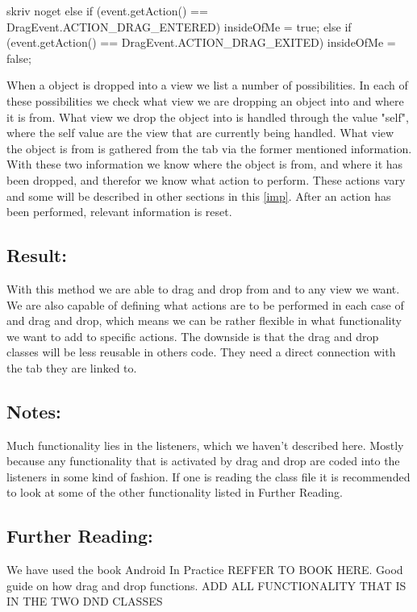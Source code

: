 \begin{source}[{elseif}]{skriv noget}
else if (event.getAction() == DragEvent.ACTION_DRAG_ENTERED){ 
			insideOfMe = true;
			} 
else if (event.getAction() == DragEvent.ACTION_DRAG_EXITED){
			insideOfMe = false;
			}
\end{source}
When a object is dropped into a view we list a number of possibilities. 
In each of these possibilities we check what view we are dropping an object into and where it is from. What view we drop the object into is handled through the value "self", where the self value are the view that are currently being handled. 
What view the object is from is gathered from the tab via the former mentioned information. 
With these two information we know where the object is from, and where it has been dropped, and therefor we know what action to perform. 
These actions vary and some will be described in other sections in this \autoref{imp}. 
After an action has been performed, relevant information is reset.

\subsection*{Result:}
With this method we are able to drag and drop from and to any view we want. 
We are also capable of defining what actions are to be performed in each case of and drag and drop, which means we can be rather flexible in what functionality we want to add to specific actions. 
The downside is that the drag and drop classes will be less reusable in others code. 
They need a direct connection with the tab they are linked to.


\subsection*{Notes:}
Much functionality lies in the listeners, which we haven't described here. Mostly because any functionality that is activated by drag and drop are coded into the listeners in some kind of fashion. If one is reading the class file it is recommended to look at some of the other functionality listed in Further Reading.


\subsection*{Further Reading:}
We have used the book Android In Practice REFFER TO BOOK HERE. Good guide on how drag and drop functions.
ADD ALL FUNCTIONALITY THAT IS IN THE TWO DND CLASSES